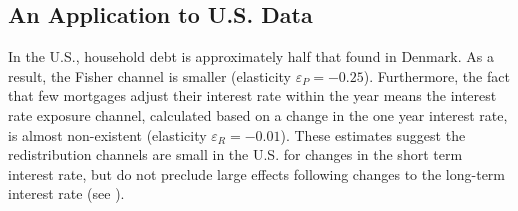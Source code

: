 \documentclass[titlepage]{\econtex}\newcommand{\texname}{ConsumptionHeterogeneity}
\begin{document}
\subsection{An Application to U.S. Data}


In the U.S., household debt is approximately half that found in Denmark. As a result, the Fisher channel is smaller (elasticity $\varepsilon_P = -0.25$). Furthermore, the fact that few mortgages adjust their interest rate within the year means the interest rate exposure channel, calculated based on a change in the one year interest rate, is almost non-existent (elasticity $\varepsilon_R = -0.01$). These estimates suggest the redistribution channels are small in the U.S. for changes in the short term interest rate, but do not preclude large effects following changes to the long-term interest rate (see \cite{eichenbaum_2018}).
	


	\begin{comment}
	A long outstanding question in monetary economics is why monetary policy acts with a lag. Two competing theories are habits models such as \cite{fuhrer_habit_2000} and sticky information models such as \cite{mankiw_sticky_2002}. \cite{carroll_sticky_2018} find evidence toward the idea that households react fast to their own idiosyncratic income shocks, but news about macroeconomic shocks takes time to be absorbed. A possible third alternative to both of these theories is that households respond strongly to their realized income today, but not to income anticipated in the future. As it takes time for variable rate mortgages to reset (typically from six months up to five years in Denmark), this would result in the interest rate exposure channel acting with a delay. Indeed, the literature on consumption responses to transitory income shocks has generally found little difference between anticipated and unanticipated responses. Many of the estimates in table \ref{table:MPCLiterature} use anticipated shocks (such as tax rebates) as an instrument and find large MPCs, suggesting households do not necessarily pay attention to anticipated cash flows until they arrive. \cite{ganong_consumer_2017} show this very clearly: there is a sharp consumption drop in the month that unemployment benefits expire, an entirely anticipated event. A model that takes these results seriously, along with a large role for the interest rate exposure channel of monetary policy, could be a fruitful area for future research. 
	\end{comment}
	
\end{document}
